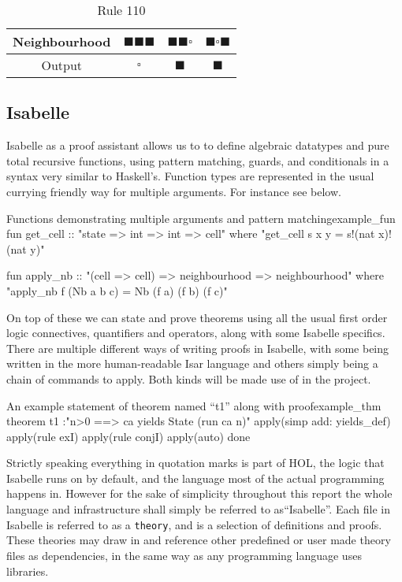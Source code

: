 \begin{table}[htbp]
    \centering
    \begin{tabular}{c|ccc}
        Neighbourhood & $\blacksquare \blacksquare \blacksquare$ & $\blacksquare \blacksquare \square$ & $\blacksquare \square \blacksquare$  \\
         \hline
         Output & $\square$ & $\blacksquare$ & $\blacksquare$
    \end{tabular}
    \caption{Rule 110}
    \label{table:rule110}
\end{table}


\subsection{Isabelle}

Isabelle as a proof assistant allows us to to define algebraic datatypes and pure total recursive functions,
using pattern matching, guards, and conditionals in a syntax very similar to Haskell's.
Function types are represented in the usual currying friendly way for multiple arguments.
For instance see  below.

\begin{myminted}{Functions demonstrating multiple arguments and pattern matching}{example_fun}
    fun get_cell :: "state => int => int => cell" where
    "get_cell s x y = s!(nat x)!(nat y)"

    fun apply_nb :: "(cell => cell) => neighbourhood => neighbourhood" where
    "apply_nb f (Nb a b c) = Nb (f a) (f b) (f c)"
\end{myminted}

On top of these we can state and prove theorems using all the usual first order logic connectives, quantifiers and operators,
along with some Isabelle specifics.
There are multiple different ways of writing proofs in Isabelle,
with some being written in the more human-readable Isar language
and others simply being a chain of commands to apply.
Both kinds will be made use of in the project.

\begin{myminted}{An example statement of theorem named ``t1'' along with proof}{example_thm}
    theorem t1 :"n>0 ==> ca yields State (run ca n)"
      apply(simp add: yields_def)
      apply(rule exI)
      apply(rule conjI)
      apply(auto)
      done
\end{myminted}

Strictly speaking everything in quotation marks is part of HOL,
the logic that Isabelle runs on by default,
and the language most of the actual programming happens in.
However for the sake of simplicity throughout this report the whole language and infrastructure shall simply be referred to as``Isabelle''.
Each file in Isabelle is referred to as a \texttt{theory},
and is a selection of definitions and proofs.
These theories may draw in and reference other predefined or user made theory files as dependencies, in the same way as any programming language uses libraries.


